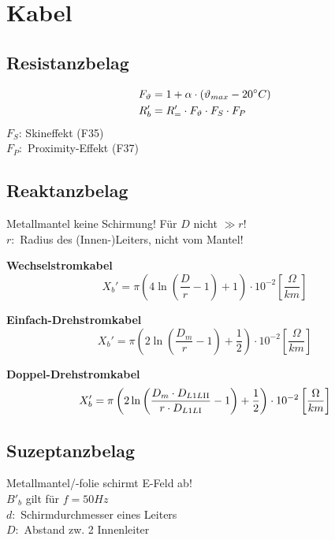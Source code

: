 \section{Kabel}

\subsection{Resistanzbelag}
\vspace{-2em}
\begin{align*}
    F_\vartheta &= 1+\alpha \cdot(\vartheta_{max} - 20\degree C)\\
    R'_b &=R'_=\cdot F_\vartheta \cdot F_S \cdot F_P
\end{align*}
$F_S$: Skineffekt (F35) \\
$F_P:$ Proximity-Effekt (F37)

\subsection{Reaktanzbelag}
Metallmantel keine Schirmung! Für $D$ nicht $\gg r$!\\
\indent $r:$ Radius des (Innen-)Leiters, nicht vom Mantel!

\textbf{Wechselstromkabel}
\begin{equation*}
    X_{b}' = \pi \left( 4 \ln \left( \frac{D}{r} -1\right) +1 \right) \cdot 10 ^{-2}   \left[\frac{\Omega}{km}\right]
\end{equation*}

\textbf{Einfach-Drehstromkabel}
\begin{equation*}
    X_{b}' = \pi \left( 2 \ln \left( \frac{D_{m}}{r} -1\right) +\frac{1}{2} \right) \cdot 10 ^{-2}   \left[\frac{\Omega}{km}\right]
\end{equation*}

\textbf{Doppel-Drehstromkabel}
\begin{equation*}
    X_{b}' = \pi \left( 2 \ln \left( \frac{D_{m} \cdot D_{L1L\RN{2}}}{r \cdot D_{L1L\RN{1}}} -1\right) +\frac{1}{2} \right) \cdot 10 ^{-2}   \left[\frac{\Omega}{km}\right]
\end{equation*}

\subsection{Suzeptanzbelag}
Metallmantel/-folie schirmt E-Feld ab!\\
\indent $B'_b$ gilt für $f=50Hz$\\
\indent $d:$ Schirmdurchmesser eines Leiters\\
\indent $D:$ Abstand zw. 2 Innenleiter

